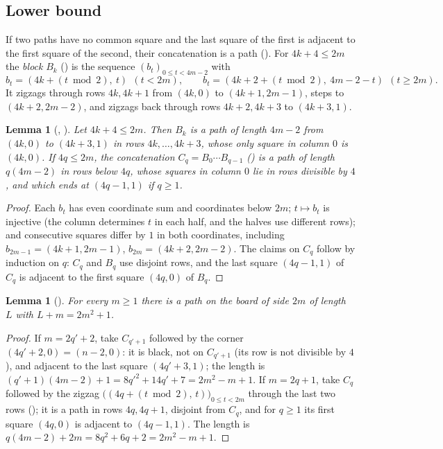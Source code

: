 \documentclass[11pt]{amsart}
\theoremstyle{plain}
\newtheorem{lemma}[theorem]{Lemma}
\theoremstyle{definition}
\begin{document}
\subsection{Lower bound}
If two paths have no common square and the last square of the first is adjacent to the first square of the second, their concatenation is a path (). For $4k+4\le 2m$ the \emph{block} $B_k$ () is the sequence $(b_t)_{0\le t<4m-2}$ with
\[
  b_t=(4k+(t\bmod 2),\ t)\ \ (t<2m),\qquad b_t=(4k+2+(t\bmod 2),\ 4m-2-t)\ \ (t\ge 2m).
\]
It zigzags through rows $4k,4k+1$ from $(4k,0)$ to $(4k+1,2m-1)$, steps to $(4k+2,2m-2)$, and zigzags back through rows $4k+2,4k+3$ to $(4k+3,1)$.

\begin{lemma}[, ]\label{lem:blk}
Let $4k+4\le 2m$. Then $B_k$ is a path of length $4m-2$ from $(4k,0)$ to $(4k+3,1)$ in rows $4k,\dots,4k+3$, whose only square in column $0$ is $(4k,0)$. If $4q\le 2m$, the concatenation $C_q=B_0\cdots B_{q-1}$ () is a path of length $q(4m-2)$ in rows below $4q$, whose squares in column $0$ lie in rows divisible by $4$, and which ends at $(4q-1,1)$ if $q\ge1$.
\end{lemma}

\begin{proof}
Each $b_t$ has even coordinate sum and coordinates below $2m$; $t\mapsto b_t$ is injective (the column determines $t$ in each half, and the halves use different rows); and consecutive squares differ by $1$ in both coordinates, including $b_{2m-1}=(4k+1,2m-1)$, $b_{2m}=(4k+2,2m-2)$. The claims on $C_q$ follow by induction on $q$: $C_q$ and $B_q$ use disjoint rows, and the last square $(4q-1,1)$ of $C_q$ is adjacent to the first square $(4q,0)$ of $B_q$.
\end{proof}

\begin{lemma}[]\label{lem:lower}
For every $m\ge1$ there is a path on the board of side $2m$ of length $L$ with $L+m=2m^2+1$.
\end{lemma}

\begin{proof}
If $m=2q'+2$, take $C_{q'+1}$ followed by the corner $(4q'+2,0)=(n-2,0)$: it is black, not on $C_{q'+1}$ (its row is not divisible by $4$), and adjacent to the last square $(4q'+3,1)$; the length is $(q'+1)(4m-2)+1=8q'^2+14q'+7=2m^2-m+1$.
If $m=2q+1$, take $C_q$ followed by the zigzag $\bigl((4q+(t\bmod2),\,t)\bigr)_{0\le t<2m}$ through the last two rows (); it is a path in rows $4q,4q+1$, disjoint from $C_q$, and for $q\ge1$ its first square $(4q,0)$ is adjacent to $(4q-1,1)$. The length is $q(4m-2)+2m=8q^2+6q+2=2m^2-m+1$.
\end{proof}
\end{document}
